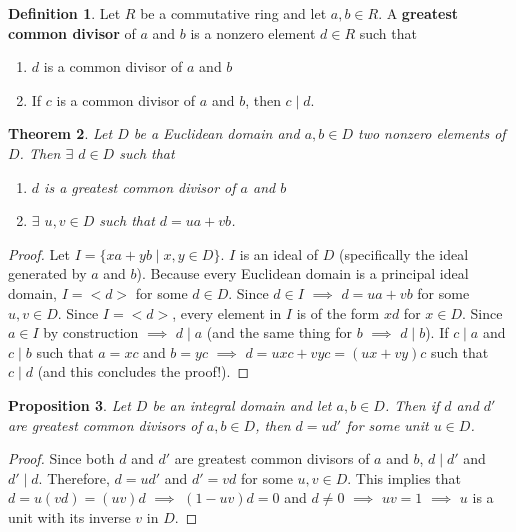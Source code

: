 \documentclass[11pt]{article}
\newtheorem{thm}{Theorem}[section]
\newtheorem{prop}[thm]{Proposition}
\theoremstyle{definition}
\newtheorem{definition}[thm]{Definition}
\numberwithin{equation}{section}
\begin{document}
\begin{definition}
Let $R$ be a commutative ring and let $a, b \in R$. A \textbf{greatest common divisor} of $a$ and $b$ is a nonzero element $d \in R$ such that \begin{enumerate}
    \item $d$ is a common divisor of $a$ and $b$
    \item If $c$ is a common divisor of $a$ and $b$, then $c \mid d$.
\end{enumerate}
\end{definition}

\begin{thm}
Let $D$ be a Euclidean domain and $a, b \in D$ two nonzero elements of $D$. Then $\exists$ $d \in D$ such that \begin{enumerate}
    \item $d$ is a greatest common divisor of $a$ and $b$
    \item $\exists$ $u, v \in D$ such that $d = ua + vb$.
\end{enumerate}
\end{thm}

\begin{proof}
Let $I = \{xa+yb \mid x, y \in D\}$. $I$ is an ideal of $D$ (specifically the ideal generated by $a$ and $b$). Because every Euclidean domain is a principal ideal domain, $I = <d>$ for some $d \in D$. Since $d \in I$ $\implies$ $d = ua+vb$ for some $u, v \in D$. Since $I = <d>$, every element in $I$ is of the form $xd$ for $x \in D$. Since $a \in I$ by construction $\implies$ $d \mid a$ (and the same thing for $b$ $\implies$ $d \mid b$). If $c \mid a$ and $c \mid b$ such that $a = xc$ and $b = yc$ $\implies$ $d = uxc+vyc = (ux+vy)c$ such that $c \mid d$ (and this concludes the proof!).
\end{proof}

\begin{prop}
Let $D$ be an integral domain and let $a, b \in D$. Then if $d$ and $d'$ are greatest common divisors of $a, b \in D$, then $d = ud'$ for some unit $u \in D$.
\end{prop}

\begin{proof}
Since both $d$ and $d'$ are greatest common divisors of $a$ and $b$, $d \mid d'$ and $d' \mid d$. Therefore, $d = ud'$ and $d' = vd$ for some $u, v \in D$. This implies that $d = u(vd) = (uv)d$ $\implies$ $(1-uv)d = 0$ and $d \neq 0$ $\implies$ $uv = 1$ $\implies$ $u$ is a unit with its inverse $v$ in $D$.
\end{proof}
\end{document}
